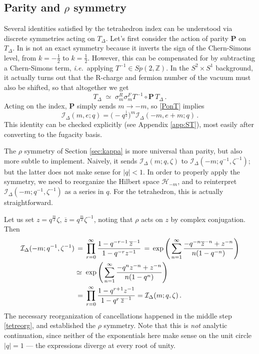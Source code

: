 \documentclass[11pt,letterpaper]{article}
\numberwithin{equation}{section}
\newcommand{\be}{\begin{equation}}
\newcommand{\ee}{\end{equation}}
\newcommand{\mb}{\mathbf}
\newcommand{\ol}{\overline}
\newcommand{\ie}{\emph{i.e.}}
\newcommand{\Z}{{\mathbb Z}}
\newcommand{\CH}{\mathcal{H}}
\newcommand{\CI}{\mathcal{I}}
\begin{document}
\subsection{Parity and $\rho$ symmetry}
\label{sec:tetkappa}

Several identities satisfied by the tetrahedron index can be understood via discrete symmetries acting on $T_\Delta$.
Let's first consider the action of parity $\mb{P}$ on $T_\Delta$. In is not an exact symmetry because it inverts the sign of the Chern-Simons level, from $k=-\tfrac12$ to $k=\tfrac12$. However, this can be compensated for by subtracting a Chern-Simons term, \ie\ applying $T^{-1}\in Sp(2,\Z)$. In the $S^2\times S^1$ background, it actually turns out that the R-charge and fermion number of the vacuum must also be shifted, so that altogether we get
%
\be \label{PonT}
T_\Delta\;\simeq\; \sigma_m^R\sigma_m^F T^{-1}\circ \mb{P}\,T_\Delta\,. \ee
%
Acting on the index, $\mb P$ simply sends $m\to -m$, so \eqref{PonT} implies
%
\be \CI_\Delta(m,e;q) = \big(-q^{\frac12}\big)^m\CI_\Delta(-m,e+m;q)\,.
\label{tetPem} \ee
%
This identity can be checked explicitly (see Appendix \ref{app:ST}), most easily after converting to the fugacity basis.


The $\rho$ symmetry of Section \ref{sec:kappa} is more universal than parity, but also more subtle to implement. Naively, it sends $\CI_\Delta(m;q,\zeta)$ to $\CI_\Delta(-m;q^{-1},\zeta^{-1})$; but the latter does not make sense for $|q|<1$. In order to properly apply the symmetry, we need to reorganize the Hilbert space $\CH_{-m}$, and to reinterpret $\CI_\Delta(-m;q^{-1},\zeta^{-1})$ as a series in $q$. For the tetrahedron, this is actually straightforward.

Let us set $z=q^{\frac m2}\zeta$, $\ol z=q^{\frac m2}\zeta^{-1}$, noting that $\rho$ acts on $z$ by complex conjugation. Then
%
\begin{align} \CI_\Delta(-m;q^{-1},\zeta^{-1}) &\,=\, \prod_{r=0}^\infty \frac{1-q^{-r-1}\,\ol z^{-1}}{1-q^{-r} z^{-1}}  \,=\, \exp\left(\, \sum_{n=1}^\infty \frac{-q^{-n}\ol z^{-n}+z^{-n}}{n(1-q^{-n})} \right) \notag \\
 &\simeq\; \exp\left(\, \sum_{n=1}^\infty \frac{-q^n z^{-n}+z^{-n}}{n(1-q^n)}  \right)\label{tetreorg} \\
 &\,=\, \prod_{r=0}^\infty \frac{1-q^{r+1}z^{-1}}{1-q^r \,\ol z^{-1}} = \CI_\Delta(m;q,\zeta)\,. \notag
\end{align}
%
The necessary reorganization of cancellations happened in the middle step \eqref{tetreorg}, and established the $\rho$ symmetry. Note that this is \emph{not} analytic continuation, since neither of the exponentials here make sense on the unit circle $|q|=1$ --- the expressions diverge at every root of unity.
\end{document}
